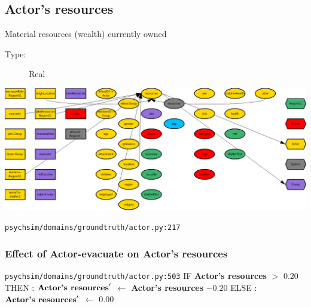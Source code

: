 \documentclass{article}%
\begin{document}
%
\subsection{Actor's resources}%
\label{subsec:Actor's resources}%
Material resources (wealth) currently owned%
\begin{description}%
\item[Type:]%
Real%
\end{description}%
\includegraphics[width=\textwidth]{images/resourcesOfActor.png}%
\begin{flushleft}%
\verb|psychsim/domains/groundtruth/actor.py:217|%
\end{flushleft}%
\subsubsection{Effect of Actor{-}evacuate on Actor's resources}%
\label{ssubsec:Effect of Actor{-}evacuate on Actor's resources}%
\begin{flushleft}%
\verb|psychsim/domains/groundtruth/actor.py:503|%
\linebreak%
IF %
\textbf{Actor's resources}%
$>$%
0.20%
\linebreak%
\hspace*{2em}%
THEN %
: %
$\mbox{\textbf{Actor's resources}} '$%
$\leftarrow$%
\textbf{Actor's resources}%
${-}0.20$%
\linebreak%
\hspace*{2em}%
ELSE %
: %
$\mbox{\textbf{Actor's resources}} '$%
$\leftarrow$%
0.00%
\end{flushleft}

%
\end{document}
